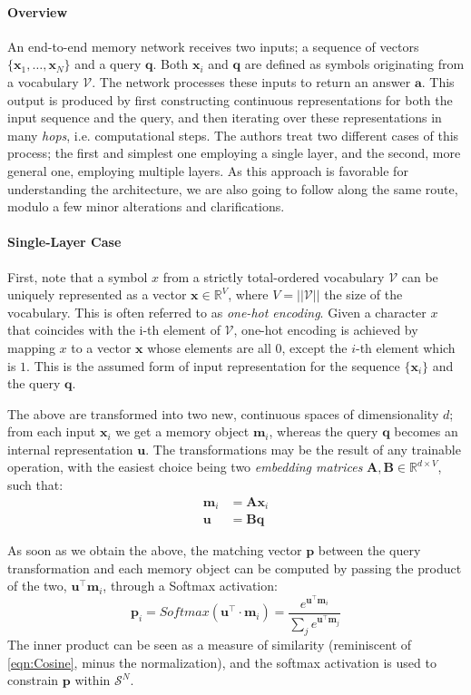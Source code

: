\documentclass[]{article}
\begin{document}
\paragraph{Overview}
An end-to-end memory network receives two inputs; a sequence of vectors $\{\pmb{x}_1,\dots,\pmb{x}_N\}$ and a query $\pmb{q}$. Both $\pmb{x}_i$ and $\pmb{q}$ are defined as symbols originating from a vocabulary $\mathcal{V}$. The network processes these inputs to return an answer $\pmb{a}$. This output is produced by first constructing continuous representations for both the input sequence and the query, and then iterating over these representations in many \textit{hops}, i.e. computational steps. The authors treat two different cases of this process; the first and simplest one employing a single layer, and the second, more general one, employing multiple layers. As this approach is favorable for understanding the architecture, we are also going to follow along the same route, modulo a few minor alterations and clarifications.

\paragraph{Single-Layer Case} First, note that a symbol $x$ from a strictly total-ordered vocabulary $\mathcal{V}$ can be uniquely represented as a vector $\pmb{x} \in \mathbb{R}^{V}$, where $V = ||\mathcal{V}||$ the size of the vocabulary. This is often referred to as \textit{one-hot encoding}. Given a character $x$ that coincides with the i-th element of $\mathcal{V}$, one-hot encoding is achieved by mapping $x$ to a vector $\pmb{x}$ whose elements are all $0$, except the $i$-th element which is $1$. This is the assumed form of input representation for the sequence $\{\pmb{x}_i\}$ and the query $\pmb{q}$. 

The above are transformed into two new, continuous spaces of dimensionality $d$; from each input $\pmb{x}_i$ we get a memory object $\pmb{m}_i$, whereas the query $\pmb{q}$ becomes an internal representation $\pmb{u}$. The transformations may be the result of any trainable operation, with the easiest choice being two \textit{embedding matrices} $\pmb{A}, \pmb{B} \in \mathbb{R}^{d\times V}$, such that:
\begin{align}
\pmb{m}_i &= \pmb{A}\pmb{x}_i \tag{Memory Transformation} \\
\pmb{u} &= \pmb{B}\pmb{q} \tag{Query Transformation}
\end{align}

As soon as we obtain the above, the matching vector $\pmb{p}$ between the query transformation and each memory object can be computed by passing the product of the two, $\pmb{u}^\top \pmb{m}_i$, through a Softmax activation:
\[
\tag{Memory Matching}
\pmb{p}_i = Softmax(\pmb{u}^\top \cdot \pmb{m}_i) = \frac{e^{\pmb{u}^\top\pmb{m}_i}}{\sum_j{e^{\pmb{u}^\top\pmb{m}_j}}}
\]
The inner product can be seen as a measure of similarity (reminiscent of \ref{eqn:Cosine}, minus the normalization), and the softmax activation is used to constrain $\pmb{p}$ within $\mathcal{S}^N$. 
\end{document}
